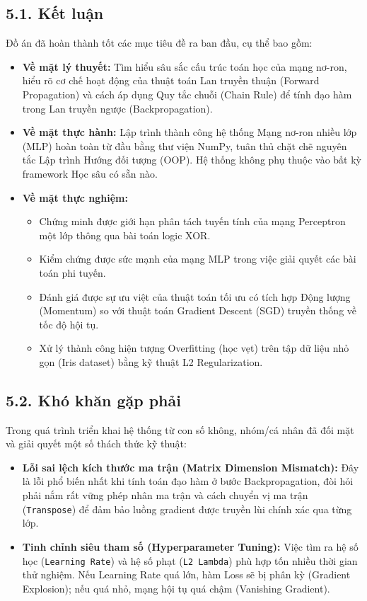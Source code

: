 \documentclass[13pt,a4paper]{article}
\begin{document}
\subsection*{5.1. Kết luận}
Đồ án đã hoàn thành tốt các mục tiêu đề ra ban đầu, cụ thể bao gồm:
\begin{itemize}
    \item \textbf{Về mặt lý thuyết:} Tìm hiểu sâu sắc cấu trúc toán học của mạng nơ-ron, hiểu rõ cơ chế hoạt động của thuật toán Lan truyền thuận (Forward Propagation) và cách áp dụng Quy tắc chuỗi (Chain Rule) để tính đạo hàm trong Lan truyền ngược (Backpropagation).
    \item \textbf{Về mặt thực hành:} Lập trình thành công hệ thống Mạng nơ-ron nhiều lớp (MLP) hoàn toàn từ đầu bằng thư viện NumPy, tuân thủ chặt chẽ nguyên tắc Lập trình Hướng đối tượng (OOP). Hệ thống không phụ thuộc vào bất kỳ framework Học sâu có sẵn nào.
    \item \textbf{Về mặt thực nghiệm:} 
    \begin{itemize}
        \item Chứng minh được giới hạn phân tách tuyến tính của mạng Perceptron một lớp thông qua bài toán logic XOR.
        \item Kiểm chứng được sức mạnh của mạng MLP trong việc giải quyết các bài toán phi tuyến.
        \item Đánh giá được sự ưu việt của thuật toán tối ưu có tích hợp Động lượng (Momentum) so với thuật toán Gradient Descent (SGD) truyền thống về tốc độ hội tụ.
        \item Xử lý thành công hiện tượng Overfitting (học vẹt) trên tập dữ liệu nhỏ gọn (Iris dataset) bằng kỹ thuật L2 Regularization.
    \end{itemize}
\end{itemize}

\subsection*{5.2. Khó khăn gặp phải}
Trong quá trình triển khai hệ thống từ con số không, nhóm/cá nhân đã đối mặt và giải quyết một số thách thức kỹ thuật:
\begin{itemize}
    \item \textbf{Lỗi sai lệch kích thước ma trận (Matrix Dimension Mismatch):} Đây là lỗi phổ biến nhất khi tính toán đạo hàm ở bước Backpropagation, đòi hỏi phải nắm rất vững phép nhân ma trận và cách chuyển vị ma trận (\texttt{Transpose}) để đảm bảo luồng gradient được truyền lùi chính xác qua từng lớp.
    \item \textbf{Tinh chỉnh siêu tham số (Hyperparameter Tuning):} Việc tìm ra hệ số học (\texttt{Learning Rate}) và hệ số phạt (\texttt{L2 Lambda}) phù hợp tốn nhiều thời gian thử nghiệm. Nếu Learning Rate quá lớn, hàm Loss sẽ bị phân kỳ (Gradient Explosion); nếu quá nhỏ, mạng hội tụ quá chậm (Vanishing Gradient).
\end{itemize}
\end{document}
